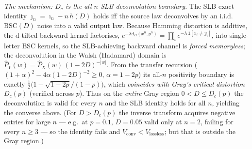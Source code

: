 \documentclass[
]{article}
\begin{document}
\emph{The mechanism: $D_c$ is the all-$n$ SLB-deconvolution boundary.} The SLB-exact identity
$\jmath_n=\imath_n-n\,h(D)$ holds iff the source law deconvolves by an i.i.d.\ $\mathrm{BSC}(D)$ noise
into a valid output law. Because Hamming distortion is additive, the d-tilted backward kernel
factorises, $e^{-\lambda d_H(x^n,y^n)}=\prod_i e^{-\lambda\,\mathbf 1[x_i\ne y_i]}$, into single-letter
$\mathrm{BSC}$ kernels, so the SLB-achieving backward channel is \emph{forced memoryless}; the
deconvolution in the Walsh (Hadamard) domain is $\hat P_Y(w)=\hat P_X(w)\,(1-2D)^{-|w|}$. From the
transfer recursion ($(1+\alpha)^2-4\alpha(1-2D)^{-2}\ge0$, $\alpha=1-2p$) its all-$n$ positivity
boundary is exactly $\tfrac12\big(1-\sqrt{1-2p}/(1-p)\big)$, which \emph{coincides with Gray's critical
distortion} $D_c(p)$ (verified across $p$). Thus on the \emph{entire} Gray region $0<D\le D_c(p)$ the
deconvolution is valid for every $n$ and the SLB identity holds for all $n$, yielding the converse
above. (For $D>D_c(p)$ the inverse transform acquires negative entries for large $n$ --- e.g.\ at
$p=0.1,\,D=0.05$ valid only at $n=2$, failing for every $n\ge3$ --- so the identity fails and
$V_{\mathrm{conv}}<V_{\mathrm{lossless}}$; but that is outside the Gray region.)
\end{document}
